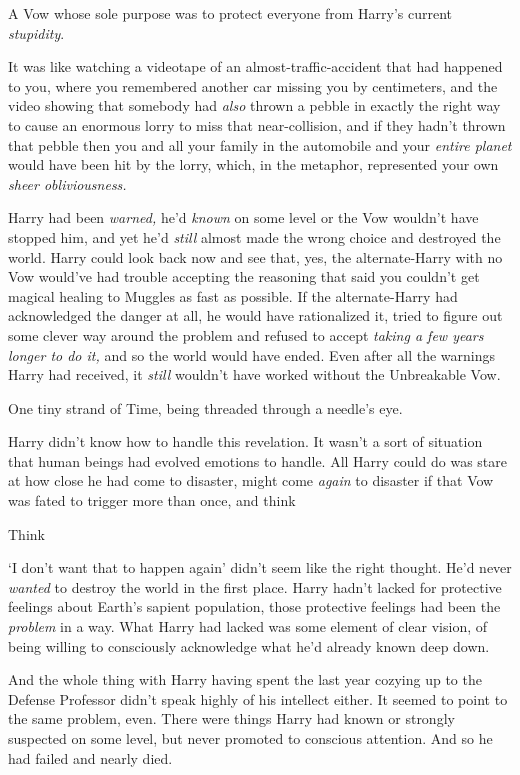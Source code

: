 A Vow whose sole purpose was to protect everyone from Harry's current
\emph{stupidity}.

It was like watching a videotape of an almost-traffic-accident that had
happened to you, where you remembered another car missing you by centimeters,
and the video showing that somebody had \emph{also} thrown a pebble in exactly
the right way to cause an enormous lorry to miss that near-collision, and if
they hadn't thrown that pebble then you and all your family in the automobile
and your \emph{entire planet} would have been hit by the lorry, which, in the
metaphor, represented your own\emph{ sheer obliviousness.}

Harry had been \emph{warned,} he'd \emph{known} on some level or the Vow
wouldn't have stopped him, and yet he'd \emph{still} almost made the wrong
choice and destroyed the world. Harry could look back now and see that, yes,
the alternate-Harry with no Vow would've had trouble accepting the reasoning
that said you couldn't get magical healing to Muggles as fast as possible. If
the alternate-Harry had acknowledged the danger at all, he would have
rationalized it, tried to figure out some clever way around the problem and
refused to accept \emph{taking a few years longer to do it,} and so the world
would have ended. Even after all the warnings Harry had received, it
\emph{still} wouldn't have worked without the Unbreakable Vow.

One tiny strand of Time, being threaded through a needle's eye.

Harry didn't know how to handle this revelation. It wasn't a sort of situation
that human beings had evolved emotions to handle. All Harry could do was stare
at how close he had come to disaster, might come \emph{again} to disaster if
that Vow was fated to trigger more than once, and think{\el}

Think{\el}

`I don't want that to happen again' didn't seem like the right thought. He'd
never \emph{wanted} to destroy the world in the first place. Harry hadn't
lacked for protective feelings about Earth's sapient population, those
protective feelings had been the \emph{problem} in a way. What Harry had lacked
was some element of clear vision, of being willing to consciously acknowledge
what he'd already known deep down.

And the whole thing with Harry having spent the last year cozying up to the
Defense Professor didn't speak highly of his intellect either. It seemed to
point to the same problem, even. There were things Harry had known or strongly
suspected on some level, but never promoted to conscious attention. And so he
had failed and nearly died.

